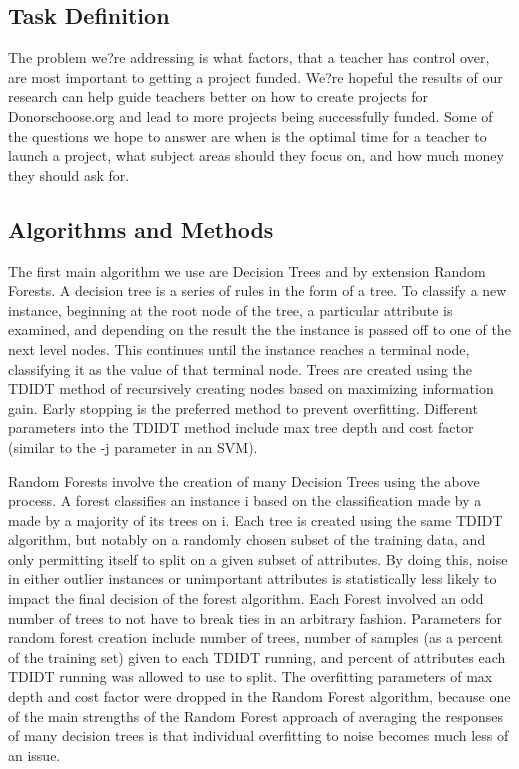\documentclass{article}
\begin{document}
\subsection{Task Definition}
The problem we?re addressing is what factors, that a teacher has control over, are most important to getting a project funded. We?re hopeful the results of our research can help guide teachers better on how to create projects for Donorschoose.org and lead to more projects being successfully funded. Some of the questions we hope to answer are when is the optimal time for a teacher to launch a project, what subject areas should they focus on, and how much money they should ask for. 

\subsection{Algorithms and Methods}
The first main algorithm we use are Decision Trees and by extension Random Forests. A decision tree is a series of rules in the form of a tree. To classify a new instance, beginning at the root node of the tree, a particular attribute is examined, and depending on the result the the instance is passed off to one of the next level nodes. This continues until the instance reaches a terminal node, classifying it as the value of that terminal node. Trees are created using the TDIDT method of recursively creating nodes based on maximizing information gain. Early stopping is the preferred method to prevent overfitting. Different parameters into the TDIDT method include max tree depth and cost factor (similar to the -j parameter in an SVM). 

Random Forests involve the creation of many Decision Trees using the above process. A forest classifies an instance i based on the classification made by a made by a majority of its trees on i. Each tree is created using the same TDIDT algorithm, but notably on a randomly chosen subset of the training data, and only permitting itself to split on a given subset of attributes. By doing this, noise in either outlier instances or unimportant attributes is statistically less likely to impact the final decision of the forest algorithm. Each Forest involved an odd number of trees to not have to break ties in an arbitrary fashion. Parameters for random forest creation include number of trees, number of samples (as a percent of the training set) given to each TDIDT running, and percent of attributes each TDIDT running was allowed to use to split. The overfitting parameters of max depth and cost factor were dropped in the Random Forest algorithm, because one of the main strengths of the Random Forest approach of averaging the responses of many decision trees is that individual overfitting to noise becomes much less of an issue.
\end{document}
